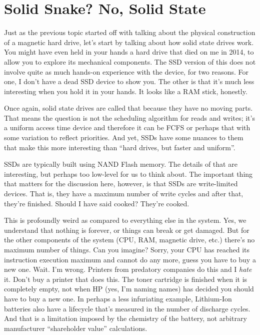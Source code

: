 




\section*{Solid Snake? No, Solid State}

Just as the previous topic started off with talking about the physical construction of a magnetic hard drive, let's start by talking about how solid state drives work. You might have even held in your hands a hard drive that died on me in 2014, to allow you to explore its mechanical components. The SSD version of this does not involve quite as much hands-on experience with the device, for two reasons. For one, I don't have a dead SSD device to show you. The other is that it's much less interesting when you hold it in your hands. It looks like a RAM stick, honestly.

Once again, solid state drives are called that because they have no moving parts. That means the question is not the scheduling algorithm for reads and writes; it's a uniform access time device and therefore it can be FCFS or perhaps that with some variation to reflect priorities. And yet, SSDs have some nuances to them that make this more interesting than ``hard drives, but faster and uniform''. 

SSDs are typically built using NAND Flash memory. The details of that are interesting, but perhaps too low-level for us to think about. The important thing that matters for the discussion here, however, is that SSDs are write-limited devices. That is, they have a maximum number of write cycles and after that, they're finished. Should I have said cooked? They're cooked.

This is profoundly weird as compared to everything else in the system. Yes, we understand that nothing is forever, or things can break or get damaged. But for the other components of the system (CPU, RAM, magnetic drive, etc.) there's no maximum number of things. Can you imagine? Sorry, your CPU has reached its instruction execution maximum and cannot do any more, guess you have to buy a new one. Wait. I'm wrong. Printers from predatory companies do this and I \textit{hate} it. Don't buy a printer that does this. The toner cartridge is finished when it is completely empty, not when HP (yes, I'm naming names) has decided you should  have to buy a new one. In perhaps a less infuriating example, Lithium-Ion batteries also have a lifecycle that's measured in the number of discharge cycles. And that is a limitation imposed by the chemistry of the battery, not arbitrary manufacturer ``shareholder value'' calculations.

